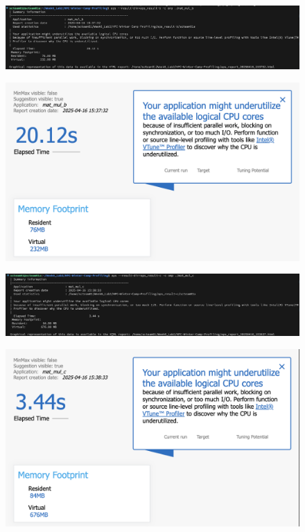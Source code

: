 \documentclass{article}
\begin{document}
\begin{figure}[htbp]
    \centering
    \includegraphics[width=1\textwidth]{./img/q1-4.png}
\end{figure}

\begin{figure}[htbp]
    \centering
    \includegraphics[width=1\textwidth]{./img/q1-5.png}
\end{figure}

\begin{figure}[htbp]
    \centering
    \includegraphics[width=1\textwidth]{./img/q1-6.png}
\end{figure}

\begin{figure}[htbp]
    \centering
    \includegraphics[width=1\textwidth]{./img/q1-7.png}
\end{figure}
\end{document}
